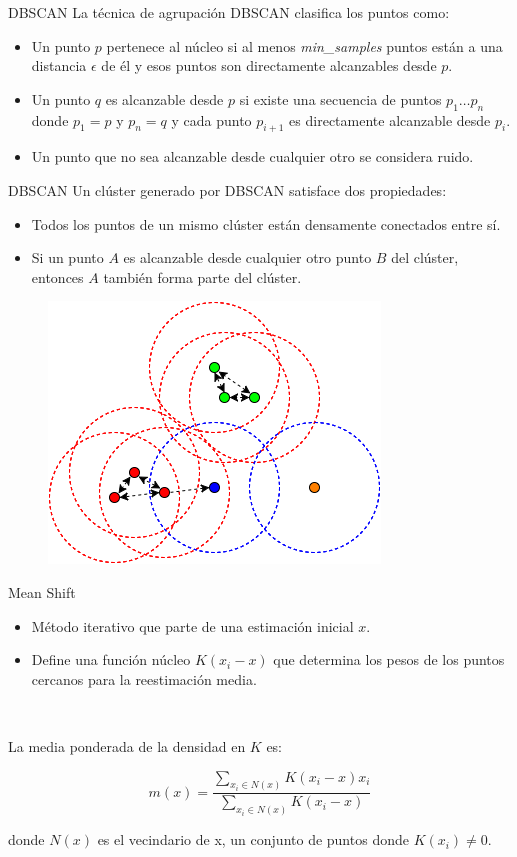 \documentclass[spanish]{beamer}
\begin{document}
\begin{frame}{DBSCAN}
La técnica de agrupación DBSCAN clasifica los puntos como:

\begin{itemize}
\item Un punto $p$ pertenece al núcleo si al menos \textit{min\_samples} puntos están a una distancia $\epsilon$ de él y esos puntos son directamente alcanzables desde $p$.
\item Un punto $q$ es alcanzable desde $p$ si existe una secuencia de puntos $p_1\dots p_n$ donde $p_1=p$ y $p_n=q$ y cada punto $p_{i+1}$ es directamente alcanzable desde $p_i$.
\item Un punto que no sea alcanzable desde cualquier otro se considera ruido.
\end{itemize}
\end{frame}

\begin{frame}{DBSCAN}
Un clúster generado por DBSCAN satisface dos propiedades:

\begin{itemize}
\item Todos los puntos de un mismo clúster están densamente conectados entre sí.
\item Si un punto $A$ es alcanzable desde cualquier otro punto $B$ del clúster, entonces $A$ también forma parte del clúster.
\end{itemize}
\begin{figure}[h]
\centering
\includegraphics[scale=0.37]{dani/DBSCAN2.png}
\end{figure}
\end{frame}

\begin{frame}{Mean Shift}
\begin{itemize}
\item Método iterativo que parte de una estimación inicial $x$.
\item Define una función núcleo $K(x_i-x)$ que determina los pesos de los puntos cercanos para la reestimación media.
\end{itemize}\

La media ponderada de la densidad en $K$ es:

$$m(x)=\dfrac{\sum_{x_i\in N(x)}K(x_i-x)x_i}{\sum_{x_i\in N(x)}K(x_i-x)}$$

donde $N(x)$ es el vecindario de x, un conjunto de puntos donde $K(x_i)\neq0$.\\
\end{frame}
\end{document}
